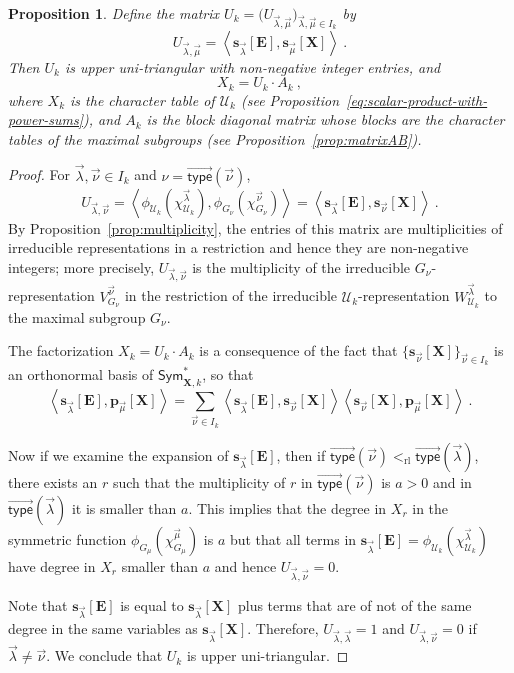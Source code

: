 \documentclass[10pt]{amsart}
\newtheorem{prop}[theorem]{Proposition}
\theoremstyle{definition}
\theoremstyle{remark}
\newcommand{\vtype}{\overrightarrow{\mathsf{type}}}
\newcommand{\XXX}{\mathbf{X}}
\newcommand{\EEE}{\mathbf{E}}
\begin{document}
\begin{prop}\label{prop:UAfactorization}
Define the matrix
$U_k = \big( U_{ \vec{\lambda}, \vec{\mu}} \big)_{\vec{\lambda}, \vec{\mu}\in I_k}$
by
\[
U_{ \vec{\lambda}, \vec{\mu}} = \left<
\mathbf{s}_{\vec{\lambda}}[\EEE], \mathbf{s}_{\vec{\mu}}[\XXX] \right>~.
\]
Then $U_k$ is upper uni-triangular with non-negative integer entries, and
\[
X_k = U_k \cdot A_k~,
\]
where $X_k$ is the character table of $\mathcal{U}_k$ \textup{(}see Proposition~\ref{eq:scalar-product-with-power-sums}\textup{)},
and $A_k$ is the block diagonal matrix whose blocks
are the character tables of the maximal subgroups \textup{(}see Proposition~\ref{prop:matrixAB}\textup{)}.
\end{prop}

\begin{proof}
For $\vec{\lambda}, \vec{\nu} \in I_k$ and $\nu = \vtype(\vec{\nu})$,
\[
U_{\vec{\lambda}, \vec{\nu}} =
\left< \phi_{\mathcal{U}_k}(\chi^{\vec{\lambda}}_{\mathcal{U}_k}),
\phi_{G_\nu}(\chi^{\vec{\nu}}_{G_\nu}) \right>
=
\left< \mathbf{s}_{\vec{\lambda}}[\EEE], \mathbf{s}_{\vec{\nu}}[\XXX] \right>~.
\]
By Proposition~\ref{prop:multiplicity},
the entries of this matrix are multiplicities of irreducible representations in a
restriction and hence they are non-negative integers; more precisely,
$U_{\vec{\lambda},\vec{\nu}}$ is the multiplicity of the irreducible
$G_\nu$-representation $V^{\vec{\nu}}_{G_\nu}$ in the restriction of
the irreducible $\mathcal{U}_k$-representation
$W^{\vec{\lambda}}_{\mathcal{U}_k}$ to the maximal subgroup $G_{\nu}$.

The factorization $X_k = U_k \cdot A_k$ is a consequence of the fact
that $\{ \mathbf{s}_{\vec{\nu}}[\XXX] \}_{\vec{\nu} \in I_k}$ is an orthonormal
basis of $\mathsf{Sym}^{\ast}_{\XXX,k}$, so that
\[
\left< \mathbf{s}_{\vec{\lambda}}[\EEE], \mathbf{p}_{\vec{\mu}}[\XXX] \right> =
\sum_{\vec{\nu} \in I_k}
\left< \mathbf{s}_{\vec{\lambda}}[\EEE], \mathbf{s}_{\vec{\nu}}[\XXX] \right>
\left< \mathbf{s}_{\vec{\nu}}[\XXX], \mathbf{p}_{\vec{\mu}}[\XXX] \right>~.
\]

Now if we examine the expansion of
$\mathbf{s}_{\vec{\lambda}}[\EEE]$,
then if $\vtype(\vec{\nu}) <_{\mathrm{rl}} \vtype(\vec{\lambda})$, there
exists an $r$ such that the multiplicity of $r$ in $\vtype(\vec{\nu})$
is $a>0$ and in $\vtype(\vec{\lambda})$ it is smaller than $a$.
This implies that the degree in $X_r$ in
the symmetric function $\phi_{G_\mu}(\chi^{\vec{\mu}}_{G_\mu})$ is
$a$ but that all terms in
$\mathbf{s}_{\vec{\lambda}}[\EEE] = \phi_{\mathcal{U}_k}(\chi^{\vec{\lambda}}_{\mathcal{U}_k})$
have degree in $X_r$ smaller than $a$ and hence $U_{\vec{\lambda},\vec{\nu}} = 0$.

Note that $\mathbf{s}_{\vec{\lambda}}[\EEE]$ is equal to $\mathbf{s}_{\vec{\lambda}}[\XXX]$ plus
terms that are of not of the same degree in the same variables
as $\mathbf{s}_{\vec{\lambda}}[\XXX]$.  Therefore,
$U_{\vec{\lambda},\vec{\lambda}} = 1$ and
$U_{\vec{\lambda},\vec{\nu}} = 0$ if $\vec{\lambda} \neq \vec{\nu}$.
We conclude that $U_k$ is upper uni-triangular.
\end{proof}
\end{document}

